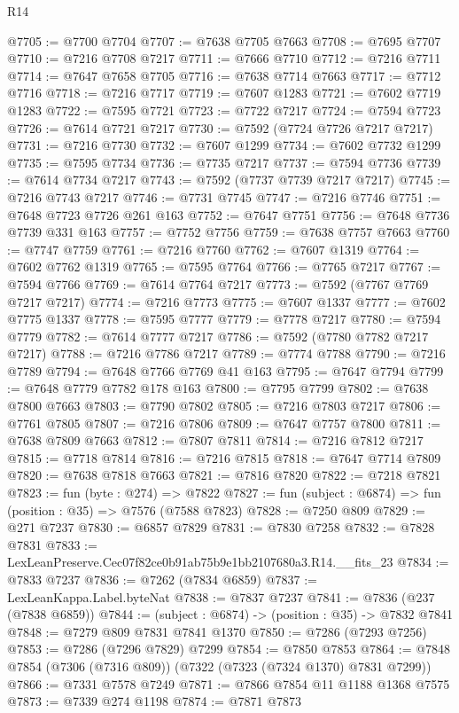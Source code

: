 \begin{lexlean}{R14}
\begin{coremodule}
@7705 := @7700 @7704
@7707 := @7638 @7705 @7663
@7708 := @7695 @7707
@7710 := @7216 @7708 @7217
@7711 := @7666 @7710
@7712 := @7216 @7711
@7714 := @7647 @7658 @7705
@7716 := @7638 @7714 @7663
@7717 := @7712 @7716
@7718 := @7216 @7717
@7719 := @7607 @1283
@7721 := @7602 @7719 @1283
@7722 := @7595 @7721
@7723 := @7722 @7217
@7724 := @7594 @7723
@7726 := @7614 @7721 @7217
@7730 := @7592 (@7724 @7726 @7217 @7217)
@7731 := @7216 @7730
@7732 := @7607 @1299
@7734 := @7602 @7732 @1299
@7735 := @7595 @7734
@7736 := @7735 @7217
@7737 := @7594 @7736
@7739 := @7614 @7734 @7217
@7743 := @7592 (@7737 @7739 @7217 @7217)
@7745 := @7216 @7743 @7217
@7746 := @7731 @7745
@7747 := @7216 @7746
@7751 := @7648 @7723 @7726 @261 @163
@7752 := @7647 @7751
@7756 := @7648 @7736 @7739 @331 @163
@7757 := @7752 @7756
@7759 := @7638 @7757 @7663
@7760 := @7747 @7759
@7761 := @7216 @7760
@7762 := @7607 @1319
@7764 := @7602 @7762 @1319
@7765 := @7595 @7764
@7766 := @7765 @7217
@7767 := @7594 @7766
@7769 := @7614 @7764 @7217
@7773 := @7592 (@7767 @7769 @7217 @7217)
@7774 := @7216 @7773
@7775 := @7607 @1337
@7777 := @7602 @7775 @1337
@7778 := @7595 @7777
@7779 := @7778 @7217
@7780 := @7594 @7779
@7782 := @7614 @7777 @7217
@7786 := @7592 (@7780 @7782 @7217 @7217)
@7788 := @7216 @7786 @7217
@7789 := @7774 @7788
@7790 := @7216 @7789
@7794 := @7648 @7766 @7769 @41 @163
@7795 := @7647 @7794
@7799 := @7648 @7779 @7782 @178 @163
@7800 := @7795 @7799
@7802 := @7638 @7800 @7663
@7803 := @7790 @7802
@7805 := @7216 @7803 @7217
@7806 := @7761 @7805
@7807 := @7216 @7806
@7809 := @7647 @7757 @7800
@7811 := @7638 @7809 @7663
@7812 := @7807 @7811
@7814 := @7216 @7812 @7217
@7815 := @7718 @7814
@7816 := @7216 @7815
@7818 := @7647 @7714 @7809
@7820 := @7638 @7818 @7663
@7821 := @7816 @7820
@7822 := @7218 @7821
@7823 := fun (byte : @274) => @7822
@7827 := fun (subject : @6874) => fun (position : @35) => @7576 (@7588 @7823)
@7828 := @7250 @809
@7829 := @271 @7237
@7830 := @6857 @7829
@7831 := @7830 @7258
@7832 := @7828 @7831
@7833 := LexLeanPreserve.Cec07f82ce0b91ab75b9e1bb2107680a3.R14.__fits_23
@7834 := @7833 @7237
@7836 := @7262 (@7834 @6859)
@7837 := LexLeanKappa.Label.byteNat
@7838 := @7837 @7237
@7841 := @7836 (@237 (@7838 @6859))
@7844 := (subject : @6874) -> (position : @35) -> @7832 @7841
@7848 := @7279 @809 @7831 @7841 @1370
@7850 := @7286 (@7293 @7256)
@7853 := @7286 (@7296 @7829) @7299
@7854 := @7850 @7853
@7864 := @7848 @7854 (@7306 (@7316 @809)) (@7322 (@7323 (@7324 @1370) @7831 @7299))
@7866 := @7331 @7578 @7249
@7871 := @7866 @7854 @11 @1188 @1368 @7575
@7873 := @7339 @274 @1198
@7874 := @7871 @7873

\end{coremodule}
\end{lexlean}
